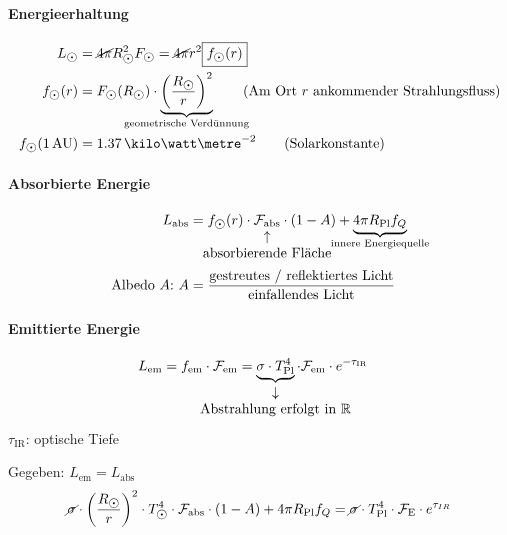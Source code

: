 \paragraph{Energieerhaltung}
\begin{align*}
    L_{\astrosun} &= \cancel{4 \pi} R_{\astrosun}^2 F_{\astrosun} = \cancel{4 \pi} r^2 \boxed{f_{\astrosun}(r)}\\
f_{\astrosun}(r) &= F_{\astrosun} (R_{\astrosun}) \cdot \underbrace{\left(\frac{R_{\astrosun}}{r}\right)^2}_{\mathclap{\text{geometrische Verdünnung}}} \tag{Am Ort $r$ ankommender Strahlungsfluss}\\
    f_{\astrosun}(1\,\mathrm{AU}) &= 1.37\,\kilo\watt\metre^{-2} \tag{Solarkonstante}
\end{align*}

\paragraph{Absorbierte Energie}
\begin{align*}
L_{\mathrm{abs}} &= f_{\astrosun}(r) \cdot \underset{\mathclap{\begin{matrix}\uparrow\\\text{absorbierende Fläche}\end{matrix}}}{\mathcal{F}_{\mathrm{abs}}} \cdot (1 - A) + \underbrace{4 \pi R_{\mathrm{Pl}} f_Q}_{\mathclap{\text{innere Energiequelle}}}\\
    \text{Albedo $A$:}\ A &= \frac{\text{gestreutes / reflektiertes Licht}}{\text{einfallendes Licht}}
\end{align*}

\paragraph{Emittierte Energie}
\begin{align*}
L_{\mathrm{em}} &= f_{\mathrm{em}} \cdot \mathcal{F}_{\mathrm{em}} = \underbrace{\sigma \cdot T_{\mathrm{Pl}}^4}_{\mathclap{\begin{matrix}\downarrow\\\text{Abstrahlung erfolgt in $\mathbb{R}$}\end{matrix}}}\cdot \mathcal{F}_{\mathrm{em}} \cdot e^{- \tau_{\mathrm{IR}}}
\end{align*}
$\tau_{\mathrm{IR}}$: optische Tiefe

Gegeben: $L_{\mathrm{em}} = L_{\mathrm{abs}}$
\[ \cancel{\sigma} \cdot \left(\frac{R_{\astrosun}}{r}\right)^2 \cdot T_{\astrosun}^4 \cdot \mathcal{F}_{\mathrm{abs}} \cdot (1-A) + 4 \pi R_{\mathrm{Pl}} f_Q = \cancel{\sigma} \cdot T_{\mathrm{Pl}}^4 \cdot \mathcal{F}_{\mathrm{E}} \cdot e^{\tau_{IR}} \]

